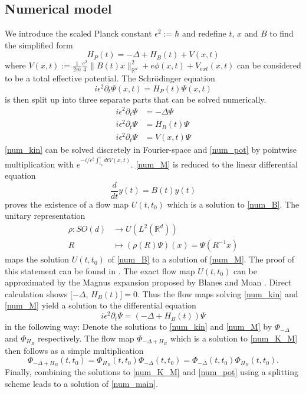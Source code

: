 \documentclass[11pt, a4paper, oneside]{article}
\begin{document}
\subsection{Numerical model}
We introduce the scaled Planck constant $\epsilon ^2 := \hbar$ and redefine $t$, $x$ and $B$ to find the simplified form
\begin{equation*}
  H_P(t) = -\Delta + H_B(t) + V(x,t)
\end{equation*}
where $V(x,t) := \frac{1}{2m}\frac{e^{2}}{4}\|B(t) x\|_{\mathbb{R}^{d}}^{2} + e \phi(x,t) + V_{ext}(x,t)$ can be considered to be a total effective potential.
The Schr{\"o}dinger equation
\begin{equation*} \label{num_main} \tag{H}
  i \epsilon ^2 \partial_t \Psi(x, t) = H_P(t)\Psi(x,t)
\end{equation*}
is then split up into three separate parts that can be solved numerically.
\begin{align}
  i \epsilon^2 \partial_t \Psi &= -\Delta \Psi \label{num_kin} \tag{K}\\
  i \epsilon^2 \partial_t \Psi &= H_B(t) \Psi \label{num_M} \tag{M}\\
  i \epsilon^2 \partial_t \Psi &= V(x,t) \Psi \label{num_pot} \tag{P}
\end{align}
\cref{num_kin} can be solved discretely in Fourier-space and \cref{num_pot} by pointwise multiplication with $e^{-i/\epsilon ^2 \int_{t_0}^t dt V(x,t)}$. \cref{num_M} is reduced to the linear differential equation
\begin{equation} \label{num_B} \tag{B}
  \frac{d}{dt}y(t) = B(t)y(t)
\end{equation}
 proves the existence of a flow map $U(t,t_0)$ which is a solution to \cref{num_B}. The unitary representation
\begin{align} \label{eq_rho}
  \rho : SO(d) &\longrightarrow U(L^2(\mathbb{R}^d)) \\
  R &\longmapsto (\rho (R)\Psi)(x) = \Psi(R^{-1} x)
\end{align}
maps the solution $U(t, t_0)$ of \cref{num_B} to a solution of \cref{num_M}. The proof of this statement can be found in . The exact flow map $U(t, t_0)$ can be approximated by the Magnus expansion proposed by Blanes and Moan .
Direct calculation shows  $[-\Delta$, $H_B(t)] = 0$. Thus the flow maps solving \cref{num_kin} and \cref{num_M} yield a solution to the differential equation
\begin{equation} \label{num_K_M} \tag{K+M}
  i \epsilon ^2 \partial_t \Psi = (-\Delta + H_B(t))\Psi
\end{equation}
in the following way: Denote the solutions to \cref{num_kin} and \cref{num_M} by $\Phi_{-\Delta}$ and $\Phi_{H_B}$ respectively. The flow map $\Phi_{-\Delta + H_B}$ which is a solution to \cref{num_K_M} then follows as a simple multiplication
\begin{equation*}
  \Phi_{-\Delta + H_B}(t, t_0) = \Phi_{H_B}(t, t_0)\Phi_{-\Delta}(t, t_0) = \Phi_{-\Delta}(t, t_0)\Phi_{H_B}(t, t_0).
\end{equation*}
Finally, combining the solutions to \cref{num_K_M} and \cref{num_pot} using a splitting scheme leads to a solution of \cref{num_main}.
\end{document}
